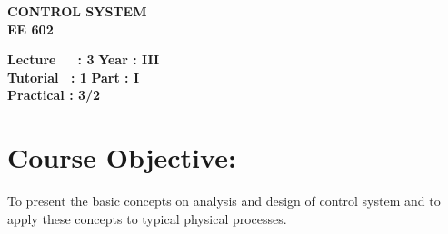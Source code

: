 \begin{center}
    \textbf{\huge{\uppercase{Control System}}}
    \\
    \vspace{.5cm}
    \textbf{\large{EE 602}}
\end{center}

\noindent\textbf{Lecture\ \ \ : 3} \hfill \textbf{Year : III} \\
\textbf{Tutorial \ : 1} \hfill \textbf{Part : I } \\
\textbf{Practical : 3/2}  \\

\par
\noindent 
\section*{Course Objective:}
To present the basic concepts on analysis and design of control system and to apply these concepts to typical physical processes.

